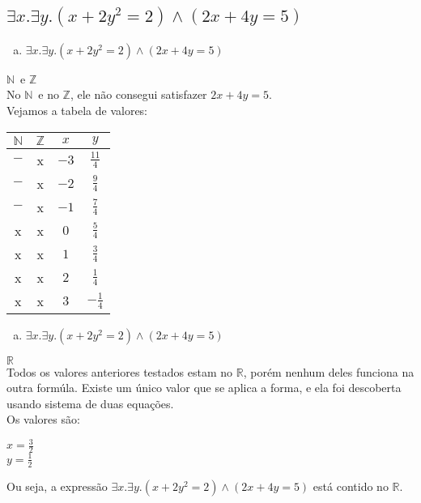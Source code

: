 \documentclass[aspectratio=43]{beamer}
\newcommand{\nat}{$\mathbb{N}$}
\newcommand{\inteiro}{$\mathbb{Z}$}
\newcommand{\real}{$\mathbb{R}$}
\begin{document}
    \subsection{$\exists x. \exists y.(x + 2y^{2} = 2) \land (2x + 4y = 5)$}
    
    \begin{frame}
	\begin{enumerate}[d)]
		\item $\exists x. \exists y.(x + 2y^{2} = 2) \land (2x + 4y = 5)$
	\end{enumerate}
    \pause
    \nat \ e \inteiro \\
   	No \nat \ e no \inteiro, ele n\~ao consegui satisfazer $2x + 4y =5$.\\
    Vejamos a tabela de valores:\\
    \begin{center}

    \begin{tabular}{c|c|c|c}
		 \nat & \inteiro & $x$ & $y$ \\ 
        \hline$-$ & x & $-3$ & \pause $\frac{11}{4}$\\
        \hline$-$ & x & $-2$ & \pause $\frac{9}{4}$\\
        \hline$-$ & x & $-1$ & \pause $\frac{7}{4}$\\
        \hline x & x & $0$ & \pause $\frac{5}{4}$\\
        \hline x & x & $1$ & \pause $\frac{3}{4}$\\
        \hline x & x & $2$ & \pause $\frac{1}{4}$\\
        \hline x & x & $3$ & \pause $-\frac{1}{4}$\\
        
	\end{tabular}
	\end{center}
      
	\end{frame}
    
    \begin{frame}
	\begin{enumerate}[d)]
		\item $\exists x. \exists y.(x + 2y^{2} = 2) \land (2x + 4y = 5)$
	\end{enumerate}
    \real \\
    Todos os valores anteriores testados estam no \real, por\'em nenhum deles funciona na outra form\'ula. Existe um \'unico valor que se aplica a forma, e ela foi descoberta usando sistema de duas equa\c c\~oes.\\
    Os valores s\~ao:\\
    \begin{center}

    $x = \frac{3}{2}$\\
    \vspace{10pt}
    $y = \frac{1}{2}$
    \end{center}
	Ou seja, a express\~ao $\exists x. \exists y.(x + 2y^{2} = 2) \land (2x + 4y = 5)$ est\'a contido no \real.
	\end{frame}
    
\end{document}
